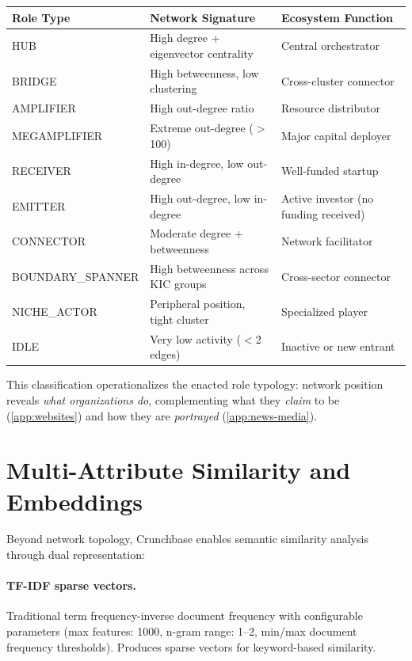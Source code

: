 \documentclass[../main.tex]{subfiles}
\begin{document}
\tableminimal
\begin{center}
\begin{tabular}{@{}p{2.5cm}p{4.5cm}p{4cm}@{}}
\toprule
\textbf{Role Type} & \textbf{Network Signature} & \textbf{Ecosystem Function} \\
\midrule
HUB & High degree + eigenvector centrality & Central orchestrator \\
BRIDGE & High betweenness, low clustering & Cross-cluster connector \\
AMPLIFIER & High out-degree ratio & Resource distributor \\
MEGAMPLIFIER & Extreme out-degree ($>$100) & Major capital deployer \\
RECEIVER & High in-degree, low out-degree & Well-funded startup \\
EMITTER & High out-degree, low in-degree & Active investor (no funding received) \\
CONNECTOR & Moderate degree + betweenness & Network facilitator \\
BOUNDARY\_SPANNER & High betweenness across KIC groups & Cross-sector connector \\
NICHE\_ACTOR & Peripheral position, tight cluster & Specialized player \\
IDLE & Very low activity ($<$2 edges) & Inactive or new entrant \\
\bottomrule
\end{tabular}
\end{center}

This classification operationalizes the enacted role typology:
network position reveals \emph{what organizations do},
complementing what they \emph{claim} to be (\cref{app:websites})
and how they are \emph{portrayed} (\cref{app:news-media}).


\section{Multi-Attribute Similarity and Embeddings}
\label{sec:crunchbase-similarity}

Beyond network topology, Crunchbase enables semantic similarity analysis
through dual representation:

\paragraph{TF-IDF sparse vectors.}
Traditional term frequency-inverse document frequency with configurable
parameters (max features: 1000, n-gram range: 1--2, min/max document
frequency thresholds).
Produces sparse vectors for keyword-based similarity.
\end{document}
